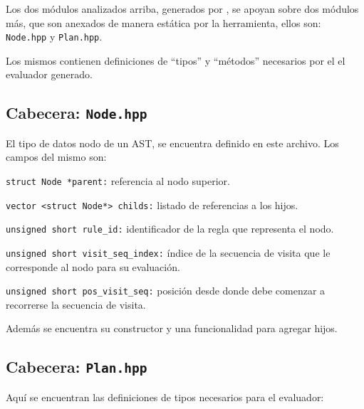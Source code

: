 Los dos módulos analizados arriba, generados por \maggen, se apoyan sobre dos módulos más, que son anexados de manera estática por la herramienta, ellos son: \texttt{Node.hpp} y \texttt{Plan.hpp}.

Los mismos contienen definiciones de ``tipos'' y ``métodos'' necesarios por el el evaluador generado.

\subsection{Cabecera: \texttt{Node.hpp}}

El tipo de datos nodo de un AST, se encuentra definido en este archivo. Los campos del mismo son:
\begin{items}
\item \texttt{struct Node *parent:} referencia al nodo superior.

\item \texttt{vector <struct Node*>\ childs:} listado de referencias a los hijos.

\item \texttt{unsigned short rule\_id:} identificador de la regla que representa el nodo.

\item \texttt{unsigned short visit\_seq\_index:} índice de la secuencia de visita que le corresponde al nodo para su evaluación.

\item \texttt{unsigned short pos\_visit\_seq:} posición desde donde debe comenzar a recorrerse la secuencia de visita.
\end{items}

Además se encuentra su constructor y una funcionalidad para agregar hijos.

\subsection{Cabecera: \texttt{Plan.hpp}}

Aquí se encuentran las definiciones de tipos necesarios para el evaluador:

